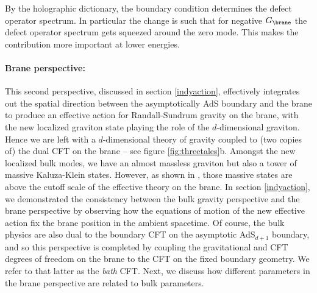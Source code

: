 


By the holographic dictionary, the boundary condition determines the defect operator spectrum. In particular the change is such that for negative $G_\brane$ the defect operator spectrum gets squeezed around the zero mode. This makes the contribution more important at lower energies. 





\paragraph{Brane perspective:} This second perspective, discussed in section \ref{indyaction}, effectively integrates out the spatial direction between the asymptotically AdS boundary and the brane to produce an effective action for Randall-Sundrum gravity on the brane, with the new localized graviton state playing the role of the $d$-dimensional graviton. Hence we are left with a $d$-dimensional theory of gravity coupled to (two copies of) the dual CFT on the brane -- see figure \ref{fig:threetales}b. Amongst the new localized bulk modes, we have an almost massless graviton but also a tower of massive Kaluza-Klein states. However, as shown in \cite{Karch:2000ct}, those massive states are above the cutoff scale of the effective theory on the brane.
In section \ref{indyaction}, we demonstrated the consistency between the bulk gravity perspective and the brane perspective by observing how the equations of motion of the new effective action fix the brane position in the ambient spacetime. Of course, the bulk physics are also dual to the boundary CFT on the asymptotic AdS$_{d+1}$ boundary, and so this perspective is completed by coupling the gravitational and CFT degrees of freedom on the brane to the CFT on the fixed boundary geometry. We refer to that latter as the {\it bath} CFT. Next, we discuss how different parameters in the brane perspective are related to bulk parameters. 

